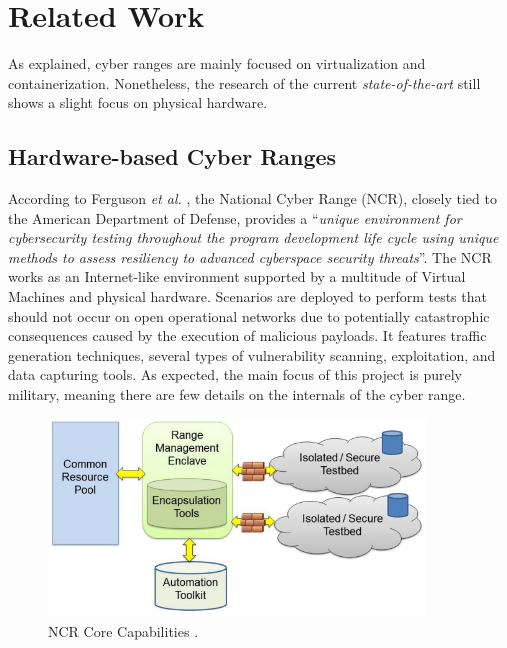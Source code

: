 \section{Related Work} \label{sec:cyber_ranges}

As explained, cyber ranges are mainly focused on virtualization and containerization. Nonetheless, the research of the current \textit{state-of-the-art} still shows a slight focus on physical hardware.

\subsection{Hardware-based Cyber Ranges} \label{sec:hardware_based_cr}


According to Ferguson \textit{et al.} \cite{national_cr_ref}, the National Cyber Range (NCR), closely tied to the American Department of Defense, provides a ``\textit{unique environment for cybersecurity testing throughout the program development life cycle using unique methods to assess resiliency to advanced cyberspace security threats}''. The NCR works as an Internet-like environment supported by a multitude of Virtual Machines and physical hardware. Scenarios are deployed to perform tests that should not occur on open operational networks due to potentially catastrophic consequences caused by the execution of malicious payloads. It features traffic generation techniques, several types of vulnerability scanning, exploitation, and data capturing tools. As expected, the main focus of this project is purely military, meaning there are few details on the internals of the cyber range.

\begin{figure}[H]
    \includegraphics[width=10cm]{figures/ncr_core_capabilities.png}
    \caption{NCR Core Capabilities \cite{national_cr_ref}.}
    \label{fig:ncr_core_capabilities}
\end{figure}

